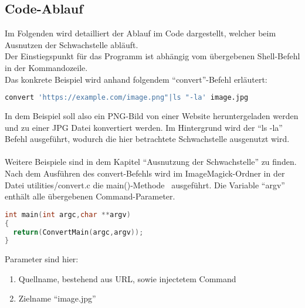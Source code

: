 
\subsection{Code-Ablauf}\label{subsec:code-ablauf}

Im Folgenden wird detailliert der Ablauf im Code dargestellt, welcher beim Ausnutzen der Schwachstelle abläuft.\\

Der Einstiegspunkt für das Programm ist abhängig vom übergebenen Shell-Befehl in der Kommandozeile.\\

Das konkrete Beispiel wird anhand folgendem "`convert"'-Befehl erläutert:

\begin{lstlisting}[language=Bash, caption=Beispielbefehl Codeablauf,label={lst:codeablaufbeispiel}]
convert 'https://example.com/image.png"|ls "-la' image.jpg
\end{lstlisting}
\vspace{5mm}

In dem Beispiel soll also ein PNG-Bild von einer Website heruntergeladen werden und zu einer JPG Datei konvertiert werden.
Im Hintergrund wird der "`ls -la"' Befehl ausgeführt, wodurch die hier betrachtete Schwachstelle ausgenutzt wird.\\\\
Weitere Beispiele sind in dem Kapitel "`Ausnutzung der Schwachstelle"' zu finden. \\

Nach dem Ausführen des convert-Befehls wird im ImageMagick-Ordner in der Datei utilities/convert.c die main()-Methode~\cite{DeklarationMain} ausgeführt.
Die Variable "`argv"' enthält alle übergebenen Command-Parameter.\\

\begin{lstlisting}[firstnumber=90, language=C, caption=utilities/convert.c Einstieg main(),label={lst:lstlisting}]
int main(int argc,char **argv)
{
  return(ConvertMain(argc,argv));
}
\end{lstlisting}
\vspace{5mm}

Parameter sind hier:
\begin{enumerate}
  \item Quellname, bestehend aus URL, sowie injectetem Command
  \item Zielname "`image.jpg"'
\end{enumerate}

